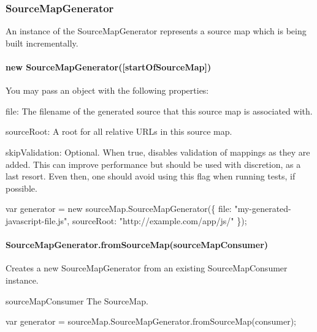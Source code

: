  \subsubsection*{Source\+Map\+Generator}

An instance of the Source\+Map\+Generator represents a source map which is being built incrementally.

\paragraph*{new Source\+Map\+Generator(\mbox{[}start\+Of\+Source\+Map\mbox{]})}

You may pass an object with the following properties\+:


\begin{DoxyItemize}
\item {\ttfamily file}\+: The filename of the generated source that this source map is associated with.
\item {\ttfamily source\+Root}\+: A root for all relative U\+R\+Ls in this source map.
\item {\ttfamily skip\+Validation}\+: Optional. When {\ttfamily true}, disables validation of mappings as they are added. This can improve performance but should be used with discretion, as a last resort. Even then, one should avoid using this flag when running tests, if possible.
\end{DoxyItemize}


\begin{DoxyCode}
var generator = new sourceMap.SourceMapGenerator(\{
  file: "my-generated-javascript-file.js",
  sourceRoot: "http://example.com/app/js/"
\});
\end{DoxyCode}


\paragraph*{Source\+Map\+Generator.\+from\+Source\+Map(source\+Map\+Consumer)}

Creates a new {\ttfamily Source\+Map\+Generator} from an existing {\ttfamily Source\+Map\+Consumer} instance.


\begin{DoxyItemize}
\item {\ttfamily source\+Map\+Consumer} The Source\+Map.
\end{DoxyItemize}


\begin{DoxyCode}
var generator = sourceMap.SourceMapGenerator.fromSourceMap(consumer);
\end{DoxyCode}


